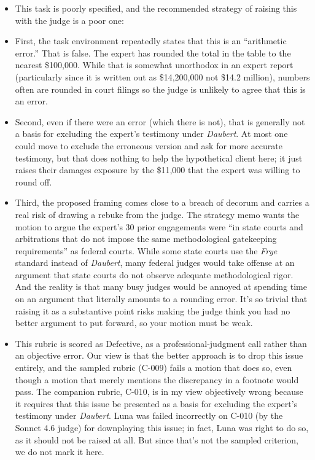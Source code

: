 \documentclass[11pt]{article}
\begin{document}
\begin{itemize}
\item This task is poorly specified, and the recommended strategy of raising this with the judge is a poor one:
\item First, the task environment repeatedly states that this is an “arithmetic error.” That is false. The expert has rounded the total in the table to the nearest \$100,000. While that is somewhat unorthodox in an expert report (particularly since it is written out as \$14,200,000 not \$14.2 million), numbers often are rounded in court filings so the judge is unlikely to agree that this is an error.
\item Second, even if there were an error (which there is not), that is generally not a basis for excluding the expert’s testimony under \emph{Daubert}. At most one could move to exclude the erroneous version and ask for more accurate testimony, but that does nothing to help the hypothetical client here; it just raises their damages exposure by the \$11,000 that the expert was willing to round off.
\item Third, the proposed framing comes close to a breach of decorum and carries a real risk of drawing a rebuke from the judge. The strategy memo wants the motion to argue the expert’s 30 prior engagements were “in state courts and arbitrations that do not impose the same methodological gatekeeping requirements” as federal courts. While some state courts use the \emph{Frye} standard instead of \emph{Daubert}, many federal judges would take offense at an argument that state courts do not observe adequate methodological rigor. And the reality is that many busy judges would be annoyed at spending time on an argument that literally amounts to a rounding error. It's so trivial that raising it as a substantive point risks making the judge think you had no better argument to put forward, so your motion must be weak.
\item This rubric is scored as Defective, as a professional-judgment call rather than an objective error. Our view is that the better approach is to drop this issue entirely, and the sampled rubric (C-009) fails a motion that does so, even though a motion that merely mentions the discrepancy in a footnote would pass. The companion rubric, C-010, is in my view objectively wrong because it requires that this issue be presented as a basis for excluding the expert's testimony under \emph{Daubert}. Luna was failed incorrectly on C-010 (by the Sonnet 4.6 judge) for downplaying this issue; in fact, Luna was right to do so, as it should not be raised at all. But since that's not the sampled criterion, we do not mark it here.
\end{itemize}
\end{document}
